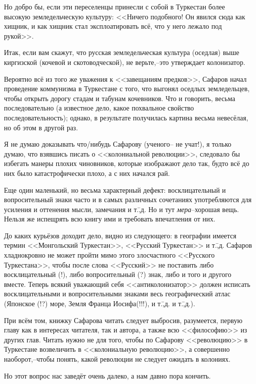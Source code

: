 Но добро бы, если эти переселенцы принесли с собой в Туркестан более высокую земледельческую культуру: <<Ничего подобного! Он явился сюда как хищник, и как хищник стал эксплоатировать всё, что у него лежало под рукой>>.

Итак, если вам скажут, что русская земледельческая культура (оседлая) выше киргизской (кочевой и скотоводческой), не верьте,\---это утверждает колонизатор.

Вероятно всё из того же уважения к <<завещаниям предков>>, Сафаров начал проведение коммунизма в Туркестане с того, что выгонял оседлых земледельцев, чтобы открыть дорогу стадам и табунам кочевников. Что и говорить, весьма последовательно (а известное дело, какое похвальное свойство последовательность); однако, в результате получилась картина весьма невесёлая, но об этом в другой раз.

Я не думаю доказывать что\-/нибудь Сафарову (ученого\--- не учат!), я только думаю, что взявшись писать о <<колониальной революции>>, следовало бы избегать манеры плохих чиновников, которые изображают дело так, будто всё до них было катастрофически плохо, а с них начался рай.

Еще один маленький, но весьма характерный дефект: восклицательный и вопросительный знаки часто и в самых различных сочетаниях употребляются для усиления и оттенения мысли, замечания и т.\=,д. Но и тут \emph{мера}\---хорошая вещь. Нельзя же испещрять всю книгу ими и требовать впечатления от них.

До каких курьёзов доходит дело, видно из следующего: в географии имеется термин <<Монгольский Туркестан>>, <<Русский Туркестан>> и т.\=,д. Сафаров хладнокровно не может пройти мимо этого злосчастного <<Русского Туркестана>>, чтобы после слова <<Русский>> не поставить либо восклицательный (!), либо вопросительный (?) знак, либо и того и другого вместе. Теперь всякий уважающий себя <<антиколонизатор>> должен исписать восклицательными и вопросительными знаками весь географический атлас (Японское (!?) море, Земля Франца Иосифа(!!!), и т.\=,д. и т.\=,д.).

При всём том, книжку Сафарова читать следует выбросив, разумеется, первую главу как в интересах читателя, так и автора, а также всю <<философию>> из других глав. Читать нужно не для того, чтобы по Сафарову <<революцию>> в Туркестане возвеличить в <<колониальную революцию>>, а совершенно наоборот,\---чтобы понять, какой революции не следует ожидать в колониях.

Но этот вопрос нас заведёт очень далеко, а нам давно пора кончить.

